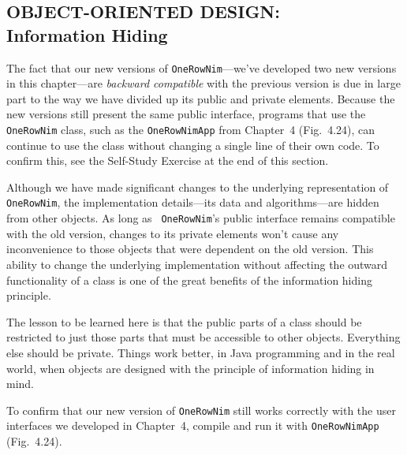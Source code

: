 \subsection{OBJECT-ORIENTED DESIGN: \\ Information Hiding}

\noindent The fact that our new versions of {\tt OneRowNim}---we've developed
two new versions in this chapter---are {\it backward compatible} with
the previous version is due in large part to
the way we have divided up its public and private elements.  Because
the new versions still present the same public interface, programs
that use the {\tt OneRowNim} class, such as the {\tt OneRowNimApp}
from Chapter~4 (Fig.~4.24), can continue to use the class without
changing a single line of their own code. To confirm this, see the
Self-Study Exercise at the end of this section.

Although we have made significant changes to the underlying
representation of {\tt OneRowNim}, the implementation details---its
data and algorithms---are hidden from other objects.  As long as {\tt
OneRowNim}'s public interface remains compatible with the old version,
changes to its private elements won't cause any inconvenience to those
objects that were dependent on the old version.  This ability to
change the underlying implementation without affecting the outward
functionality of a class is one of the great benefits of the
information hiding principle.


The lesson to be learned here is that the public parts of a class
should be restricted to just those parts that must be accessible to
other objects.  Everything else should be private.  Things work better,
in Java programming and in the real world, when objects are designed
with the principle of information hiding in mind.

\begin{SSTUDY}
\item  To confirm that our new version of {\tt OneRowNim} still works
correctly with the user interfaces we developed in Chapter~4, compile
and run it with {\tt OneRowNimApp} (Fig.~4.24).

\end{SSTUDY}

